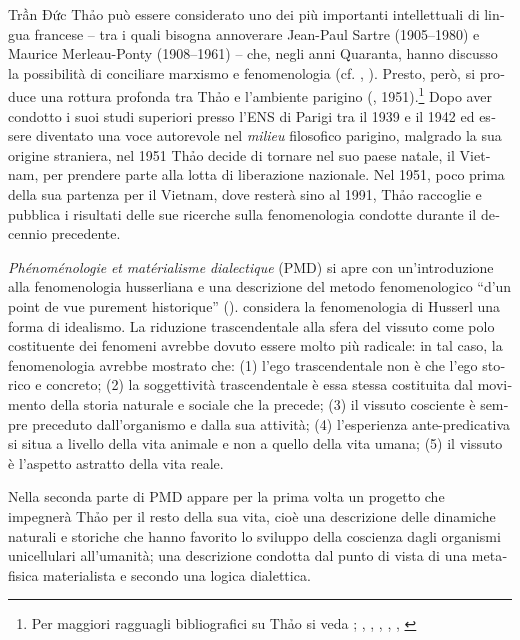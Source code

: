 \documentclass[output=paper]{langsci/langscibook}
\begin{document}
\begin{otherlanguage}{italian}
Trần Đức Thảo può essere considerato uno dei più importanti intellettuali di lingua francese – tra i quali bisogna annoverare Jean-Paul Sartre (1905--1980) e Maurice Merleau-Ponty (1908--1961) – che, negli anni Quaranta, hanno discusso la possibilità di conciliare marxismo e fenomenologia (cf. \citealt{thao_marxisme_1946}, \citeyear{thao_existentialisme_1949}). Presto, però, si produce una rottura profonda tra Thảo e l’ambiente parigino (\citealt{thao_les_1950}, \citeyear{thao_phenomenologie_1951} 1951).\footnote{ \textrm{Per maggiori ragguagli bibliografici su Thảo si veda \citealt[1--11]{thao_formation_1991}; \citealt{thao_note_1993}, \citealt{giao_ecrits_1988}, \citealt{hemery_itineraire_2013}, \citealt{thao_les_2004}, \citeyear{thao_quelques_2013}, \citealt{feron_qui_2014}}} Dopo aver condotto i suoi studi superiori presso l’ENS di Parigi tra il 1939 e il 1942 ed essere diventato una voce autorevole nel \textit{milieu} filosofico parigino, malgrado la sua origine straniera, nel 1951 Thảo decide di tornare nel suo paese natale, il Vietnam, per prendere parte alla lotta di liberazione nazionale. Nel 1951, poco prima della sua partenza per il Vietnam, dove resterà sino al 1991, Thảo raccoglie e pubblica i risultati delle sue ricerche sulla fenomenologia condotte durante il decennio precedente. 

\textit{Phénoménologie} \textit{et} \textit{matérialisme} \textit{dialectique} (PMD) si apre con un’introduzione alla fenomenologia husserliana e una descrizione del metodo fenomenologico “d’un point de vue purement historique” (\citealt[5]{thao_phenomenologie_1951}). \citet[7]{thao_phenomenologie_1951} considera la fenomenologia di Husserl una forma di idealismo. La riduzione trascendentale alla sfera del vissuto come polo costituente dei fenomeni avrebbe dovuto essere molto più radicale: in tal caso, la fenomenologia avrebbe mostrato che: (1) l’ego trascendentale non è che l’ego storico e concreto; (2) la soggettività trascendentale è essa stessa costituita dal movimento della storia naturale e sociale che la precede; (3) il vissuto cosciente è sempre preceduto dall’organismo e dalla sua attività; (4) l’esperienza ante-predicativa si situa a livello della vita animale e non a quello della vita umana; (5) il vissuto è l’aspetto astratto della vita reale.

Nella seconda parte di PMD appare per la prima volta un progetto che impegnerà Th\textlatin{ả}o per il resto della sua vita, cioè una descrizione delle dinamiche naturali e storiche che hanno favorito lo sviluppo della coscienza dagli organismi unicellulari all’umanità; una descrizione condotta dal punto di vista di una metafisica materialista e secondo una logica dialettica.


\end{otherlanguage}
\end{document}
